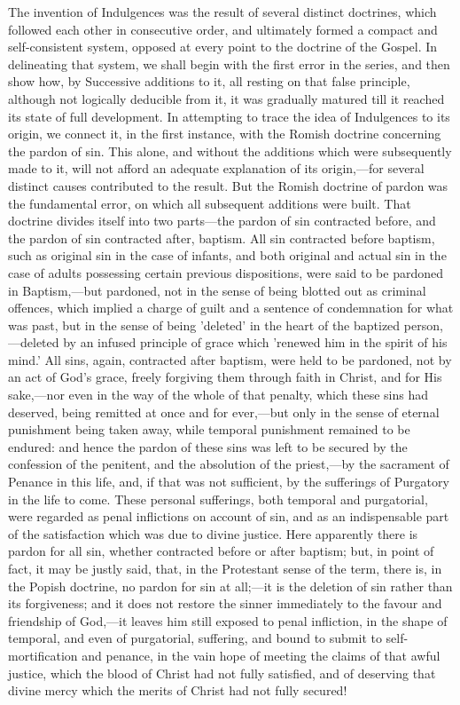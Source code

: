 \documentclass[
]{book}
\begin{document}
The invention of Indulgences was the result of several distinct doctrines, which followed each other in consecutive order, and ultimately formed a compact and self-consistent system, opposed at every point to the doctrine of the Gospel. In delineating that system, we shall begin with the first error in the series, and then show how, by Successive additions to it, all resting on that false principle, although not logically deducible from it, it was gradually matured till it reached its state of full development. In attempting to trace the idea of Indulgences to its origin, we connect it, in the first instance, with the Romish doctrine concerning the pardon of sin. This alone, and without the additions which were subsequently made to it, will not afford an adequate explanation of its origin,---for several distinct causes contributed to the result. But the Romish doctrine of pardon was the fundamental error, on which all subsequent additions were built. That doctrine divides itself into two parts---the pardon of sin contracted before, and the pardon of sin contracted after, baptism. All sin contracted before baptism, such as original sin in the case of infants, and both original and actual sin in the case of adults possessing certain previous dispositions, were said to be pardoned in Baptism,---but pardoned, not in the sense of being blotted out as criminal offences, which implied a charge of guilt and a sentence of condemnation for what was past, but in the sense of being 'deleted' in the heart of the baptized person,---deleted by an infused principle of grace which 'renewed him in the spirit of his mind.' All sins, again, contracted after baptism, were held to be pardoned, not by an act of God's grace, freely forgiving them through faith in Christ, and for His sake,---nor even in the way of the whole of that penalty, which these sins had deserved, being remitted at once and for ever,---but only in the sense of eternal punishment being taken away, while temporal punishment remained to be endured: and hence the pardon of these sins was left to be secured by the confession of the penitent, and the absolution of the priest,---by the sacrament of Penance in this life, and, if that was not sufficient, by the sufferings of Purgatory in the life to come. These personal sufferings, both temporal and purgatorial, were regarded as penal inflictions on account of sin, and as an indispensable part of the satisfaction which was due to divine justice. Here apparently there is pardon for all sin, whether contracted before or after baptism; but, in point of fact, it may be justly said, that, in the Protestant sense of the term, there is, in the Popish doctrine, no pardon for sin at all;---it is the deletion of sin rather than its forgiveness; and it does not restore the sinner immediately to the favour and friendship of God,---it leaves him still exposed to penal infliction, in the shape of temporal, and even of purgatorial, suffering, and bound to submit to self-mortification and penance, in the vain hope of meeting the claims of that awful justice, which the blood of Christ had not fully satisfied, and of deserving that divine mercy which the merits of Christ had not fully secured!
\end{document}
